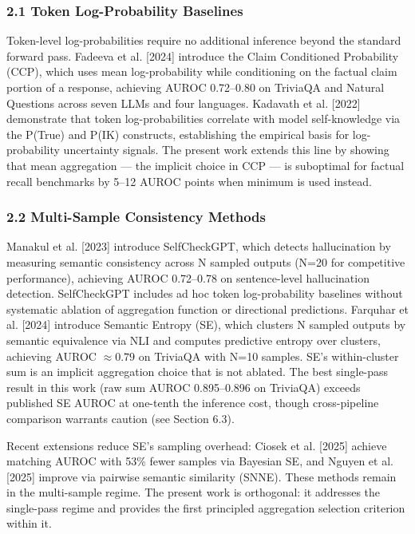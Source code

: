 
\subsubsection{2.1 Token Log-Probability Baselines}

Token-level log-probabilities require no additional inference beyond the standard forward pass. Fadeeva et al. [2024] introduce the Claim Conditioned Probability (CCP), which uses mean log-probability while conditioning on the factual claim portion of a response, achieving AUROC 0.72--0.80 on TriviaQA and Natural Questions across seven LLMs and four languages. Kadavath et al. [2022] demonstrate that token log-probabilities correlate with model self-knowledge via the P(True) and P(IK) constructs, establishing the empirical basis for log-probability uncertainty signals. The present work extends this line by showing that mean aggregation --- the implicit choice in CCP --- is suboptimal for factual recall benchmarks by 5--12 AUROC points when minimum is used instead.

\subsubsection{2.2 Multi-Sample Consistency Methods}

Manakul et al. [2023] introduce SelfCheckGPT, which detects hallucination by measuring semantic consistency across N sampled outputs (N=20 for competitive performance), achieving AUROC 0.72--0.78 on sentence-level hallucination detection. SelfCheckGPT includes ad hoc token log-probability baselines without systematic ablation of aggregation function or directional predictions. Farquhar et al. [2024] introduce Semantic Entropy (SE), which clusters N sampled outputs by semantic equivalence via NLI and computes predictive entropy over clusters, achieving AUROC $\approx 0.79$ on TriviaQA with N=10 samples. SE's within-cluster sum is an implicit aggregation choice that is not ablated. The best single-pass result in this work (raw sum AUROC 0.895--0.896 on TriviaQA) exceeds published SE AUROC at one-tenth the inference cost, though cross-pipeline comparison warrants caution (see Section 6.3).

Recent extensions reduce SE's sampling overhead: Ciosek et al. [2025] achieve matching AUROC with 53\% fewer samples via Bayesian SE, and Nguyen et al. [2025] improve via pairwise semantic similarity (SNNE). These methods remain in the multi-sample regime. The present work is orthogonal: it addresses the single-pass regime and provides the first principled aggregation selection criterion within it.

